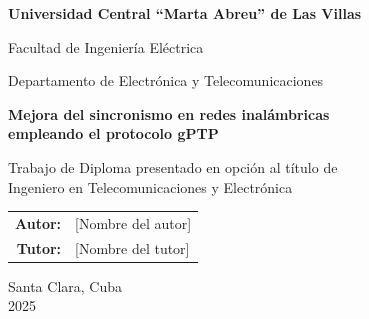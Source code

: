 
\begin{titlepage}
\begin{center}

\vspace*{3cm}

{\Large \bfseries Universidad Central ``Marta Abreu'' de Las Villas}

\vspace{0.5cm}

{\large Facultad de Ingeniería Eléctrica}

\vspace{0.5cm}

{\large Departamento de Electrónica y Telecomunicaciones}

\vspace{2cm}

{\LARGE \bfseries Mejora del sincronismo en redes inalámbricas\\empleando el protocolo gPTP}

\vspace{2cm}

{\large Trabajo de Diploma presentado en opción al título de\\Ingeniero en Telecomunicaciones y Electrónica}

\vspace{2cm}

\begin{tabular}{rl}
\textbf{Autor:} & [Nombre del autor] \\[0.3cm]
\textbf{Tutor:} & [Nombre del tutor]
\end{tabular}

\vspace{2cm}

{\large Santa Clara, Cuba\\2025}

\end{center}
\end{titlepage}
